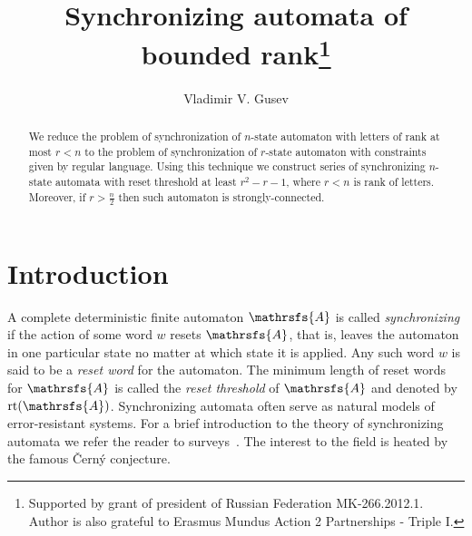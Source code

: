 \documentclass[11pt]{llncs}
\newcommand{\sa}{synchronizing automata}
\newcommand{\rl}{reset threshold}
\newcommand{\rt}{\mathrm{rt}}
\begin{document}
\title{Synchronizing automata of bounded rank\thanks{Supported
by grant of president of Russian Federation MK-266.2012.1. Author is also grateful to Erasmus
Mundus Action 2 Partnerships - Triple I.}}


\author{Vladimir V. Gusev}




\maketitle

\begin{abstract}
We reduce the problem of synchronization of $n$-state automaton
with letters of rank at most $r < n$ 
to the problem of synchronization of $r$-state 
automaton with constraints given by regular language.
Using this technique we construct series of synchronizing
$n$-state automata with reset threshold at least $r^2 -r - 1$,
where $r < n$ is rank of letters.
Moreover, if $r > \frac{n}{2}$ then such automaton is strongly-connected.
\end{abstract}

\section{Introduction}
A complete deterministic finite automaton $\mathrsfs{A}$ is called
\emph{synchronizing} if the action of some word $w$ resets $\mathrsfs{A}$, that
is, leaves the automaton in one particular state no matter at which state it is
applied. Any such word $w$ is said to be a \emph{reset word} for the automaton.
The minimum length of reset words for $\mathrsfs{A}$ is called the \emph{\rl}
of $\mathrsfs{A}$ and denoted by $\rt(\mathrsfs{A})$. Synchronizing automata
often serve as natural models of error-resistant
systems. For a brief introduction to the theory of synchronizing automata we refer
the reader to surveys~\cite{Sa05,Vo08}. 
The interest to the field is
heated by the famous \v{C}ern\'{y} conjecture.
\end{document}
